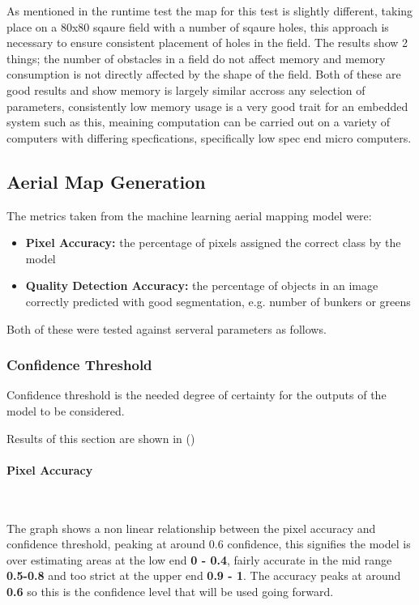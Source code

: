\documentclass[final]{cmpreport_02}
\begin{document}
As mentioned in the runtime test the map for this test is slightly different, taking place on a 80x80 sqaure field with a number of sqaure holes, this approach is necessary to ensure consistent placement of holes in the field.
The results show 2 things; the number of obstacles in a field do not affect memory and memory consumption is not directly affected by the shape of the field.
Both of these are good results and show memory is largely similar accross any selection of parameters, consistently low memory usage is a very good trait for an embedded system such as this, meaining computation can be carried out on a variety of computers with differing specfications, specifically low spec end micro computers.

\subsection{Aerial Map Generation}
The metrics taken from the machine learning aerial mapping model were:
\begin{itemize}
    \item{\textbf{Pixel Accuracy:} the percentage of pixels assigned the correct class by the model}
    \item{\textbf{Quality Detection Accuracy:} the percentage of objects in an image correctly predicted with good segmentation, e.g. number of bunkers or greens}
\end{itemize}
Both of these were tested against serveral parameters as follows.

\subsubsection{Confidence Threshold} \label{confidenceThresholdEval}

Confidence threshold is the needed degree of certainty for the outputs of the model to be considered.

Results of this section are shown in ()

\paragraph{Pixel Accuracy} \

The graph shows a non linear relationship between the pixel accuracy and confidence threshold, peaking at around 0.6 confidence, this signifies the model is over estimating areas at the low end \textbf{0 - 0.4}, fairly accurate in the mid range \textbf{0.5-0.8} and too strict at the upper end \textbf{0.9 - 1}.
The accuracy peaks at around \textbf{0.6} so this is the confidence level that will be used going forward.
\end{document}
